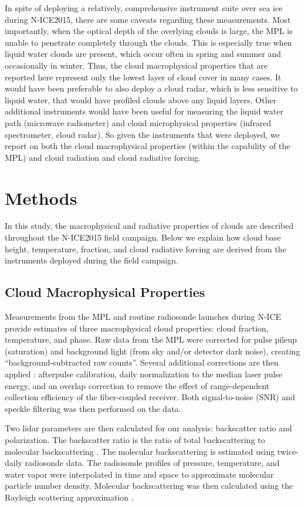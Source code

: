 In spite of deploying a relatively, comprehensive instrument suite over sea ice during N-ICE2015, there are some caveats regarding these measurements. Most importantly, when the optical depth of the overlying clouds is large, the MPL is unable to penetrate completely through the clouds. This is especially true when liquid water clouds are present, which occur often in spring and summer and occasionally in winter. Thus, the cloud macrophysical properties that are reported here represent only the lowest layer of cloud cover in many cases. It would have been preferable to also deploy a cloud radar, which is less sensitive to liquid water, that would have profiled clouds above any liquid layers. Other additional instruments would have been useful for measuring the liquid water path (microwave radiometer) and cloud microphysical properties (infrared spectrometer, cloud radar). So given the instruments that were deployed, we report on both the cloud macrophysical properties (within the capability of the MPL) and cloud radiation and cloud radiative forcing. 

\section{Methods}
In this study, the macrophysical and radiative properties of clouds are described throughout the N-ICE2015 field campaign. Below we explain how cloud base height, temperature, fraction, and cloud radiative forcing are derived from the instruments deployed during the field campaign.

\subsection{Cloud Macrophysical Properties}
Measurements from the MPL and routine radiosonde launches during N-ICE provide estimates of three macrophysical cloud properties: cloud fraction, temperature, and phase. Raw data from the MPL were corrected for pulse pileup (saturation) and background light (from sky and/or detector dark noise), creating “background-subtracted raw counts”. Several additional corrections are then applied \citep{campbell:2002, micropulse:2006}: afterpulse calibration, daily normalization to the median laser pulse energy, and an overlap correction to remove the effect of range-dependent collection efficiency of the fiber-coupled receiver. Both signal-to-noise (SNR) and speckle filtering was then performed on the data.

Two lidar parameters are then calculated for our analysis: backscatter ratio and polarization. The backscatter ratio is the ratio of total backscattering to molecular backscattering \citep{klett:1981}. The molecular backscattering is estimated using twice-daily radiosonde data. The radiosonde profiles of pressure, temperature, and water vapor were interpolated in time and space to approximate molecular particle number density. Molecular backscattering was then calculated using the Rayleigh scattering approximation \citep{bohren:2006, bohren:2008, placzek:1934}. 

